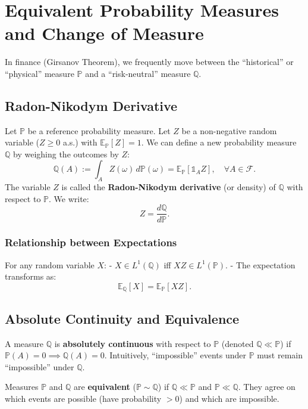 \chapter{Equivalent Probability Measures and Change of Measure}

In finance (Girsanov Theorem), we frequently move between the ``historical'' or ``physical'' measure $\mathbb{P}$ and a ``risk-neutral'' measure $\mathbb{Q}$.

\section{Radon-Nikodym Derivative}

\begin{definition}
Let $\mathbb{P}$ be a reference probability measure. Let $Z$ be a non-negative random variable ($Z \geq 0$ a.s.) with $\mathbb{E}_{\mathbb{P}}[Z] = 1$.
We can define a new probability measure $\mathbb{Q}$ by weighing the outcomes by $Z$:
\[
\mathbb{Q}(A) := \int_A Z(\omega) \, d\mathbb{P}(\omega) = \mathbb{E}_{\mathbb{P}}[ \mathbb{1}_A Z ], \quad \forall A \in \mathcal{F}.
\]
The variable $Z$ is called the \textbf{Radon-Nikodym derivative} (or density) of $\mathbb{Q}$ with respect to $\mathbb{P}$. We write:
\[
Z = \frac{d\mathbb{Q}}{d\mathbb{P}}.
\]
\end{definition}

\subsection{Relationship between Expectations}
For any random variable $X$:
- $X \in L^1(\mathbb{Q})$ iff $XZ \in L^1(\mathbb{P})$.
- The expectation transforms as:
\[
\mathbb{E}_{\mathbb{Q}}[X] = \mathbb{E}_{\mathbb{P}}[X Z].
\]

\section{Absolute Continuity and Equivalence}

\begin{definition}
A measure $\mathbb{Q}$ is \textbf{absolutely continuous} with respect to $\mathbb{P}$ (denoted $\mathbb{Q} \ll \mathbb{P}$) if $\mathbb{P}(A) = 0 \implies \mathbb{Q}(A) = 0$.
Intuitively, ``impossible'' events under $\mathbb{P}$ must remain ``impossible'' under $\mathbb{Q}$.
\end{definition}

\begin{definition}
Measures $\mathbb{P}$ and $\mathbb{Q}$ are \textbf{equivalent} ($\mathbb{P} \sim \mathbb{Q}$) if $\mathbb{Q} \ll \mathbb{P}$ and $\mathbb{P} \ll \mathbb{Q}$. They agree on which events are possible (have probability $> 0$) and which are impossible.
\end{definition}

